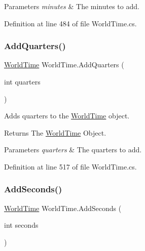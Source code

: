 \begin{DoxyParams}{Parameters}
{\em minutes} & The minutes to add.\\
\hline
\end{DoxyParams}


Definition at line 484 of file World\+Time.\+cs.

\mbox{\label{struct_world_time_afaba01854023dde8f480312814c47a79}} 
\subsubsection{\texorpdfstring{Add\+Quarters()}{AddQuarters()}}
{\footnotesize\ttfamily \hyperlink{struct_world_time}{World\+Time} World\+Time.\+Add\+Quarters (\begin{DoxyParamCaption}\item[{int}]{quarters }\end{DoxyParamCaption})}



Adds quarters to the \hyperlink{struct_world_time}{World\+Time} object. 

\begin{DoxyReturn}{Returns}
The \hyperlink{struct_world_time}{World\+Time} Object.
\end{DoxyReturn}

\begin{DoxyParams}{Parameters}
{\em quarters} & The quarters to add.\\
\hline
\end{DoxyParams}


Definition at line 517 of file World\+Time.\+cs.

\mbox{\label{struct_world_time_a223f14f497e431c3c1ca47d83e81967b}} 
\subsubsection{\texorpdfstring{Add\+Seconds()}{AddSeconds()}\hspace{0.1cm}{\footnotesize\ttfamily [1/2]}}
{\footnotesize\ttfamily \hyperlink{struct_world_time}{World\+Time} World\+Time.\+Add\+Seconds (\begin{DoxyParamCaption}\item[{int}]{seconds }\end{DoxyParamCaption})}



